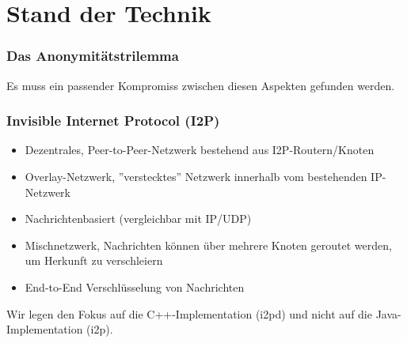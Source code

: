 \documentclass{beamer}
\begin{document}
\section{Stand der Technik}
    \begin{frame}
        \frametitle{Das Anonymitätstrilemma}

        \begin{figure}[h]
        \end{figure}

        Es muss ein passender Kompromiss zwischen diesen Aspekten gefunden werden.

    \end{frame} %

    \begin{frame}
        \frametitle{Invisible Internet Protocol (I2P)}


        \begin{itemize}
            \item Dezentrales, Peer-to-Peer-Netzwerk bestehend aus I2P-Routern/Knoten
            \item Overlay-Netzwerk, ''verstecktes'' Netzwerk innerhalb vom bestehenden IP-Netzwerk
            \item Nachrichtenbasiert (vergleichbar mit IP/UDP)
            \item Mischnetzwerk, Nachrichten können über mehrere Knoten geroutet werden, um Herkunft zu verschleiern
            \item End-to-End Verschlüsselung von Nachrichten
        \end{itemize}

        Wir legen den Fokus auf die C++-Implementation (i2pd) und nicht auf die Java-Implementation (i2p).

    \end{frame} %
\end{document}
